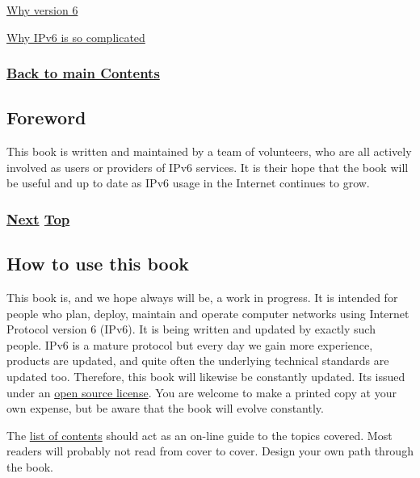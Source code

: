\documentclass[
]{article}
\begin{document}
\hyperref[why-version-6]{Why version 6}

\hyperref[why-ipv6-is-so-complicated]{Why IPv6 is so complicated}

\subsubsection{\texorpdfstring{\hyperref[list-of-contents]{Back to main
Contents}}{Back to main Contents}}\label{back-to-main-contents}

\pagebreak

\subsection{Foreword}\label{foreword}

This book is written and maintained by a team of volunteers, who are all
actively involved as users or providers of IPv6 services. It is their
hope that the book will be useful and up to date as IPv6 usage in the
Internet continues to grow.

\subsubsection{\texorpdfstring{\hyperref[how-to-use-this-book]{Next}
\hyperref[introduction-and-foreword]{Top}}{Next Top}}\label{next-top}

\pagebreak

\subsection{How to use this book}\label{how-to-use-this-book}

This book is, and we hope always will be, a work in progress. It is
intended for people who plan, deploy, maintain and operate computer
networks using Internet Protocol version 6 (IPv6). It is being written
and updated by exactly such people. IPv6 is a mature protocol but every
day we gain more experience, products are updated, and quite often the
underlying technical standards are updated too. Therefore, this book
will likewise be constantly updated. It\textquotesingle s issued under
an \href{https://github.com/becarpenter/book6/blob/main/LICENSE.md}{open
source license}. You are welcome to make a printed copy at your own
expense, but be aware that the book will evolve constantly.

The \hyperref[list-of-contents]{list of contents} should act as an
on-line guide to the topics covered. Most readers will probably not read
from cover to cover. Design your own path through the book.
\end{document}
